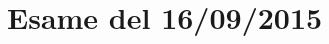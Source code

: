 \documentclass[\main/main.tex]{subfiles}
\begin{document}
\section{Esame del 16/09/2015}

\end{document}
